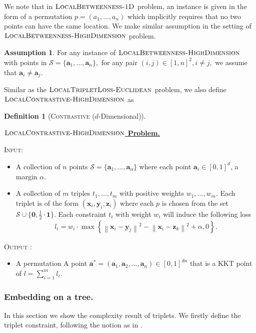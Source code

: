 \documentclass{article}
\theoremstyle{definition}  %
\newtheorem{assumption}{Assumption}
\theoremstyle{plain}
\newtheorem{definition}{Definition}
\numberwithin{observation}{section}
\numberwithin{claim}{section}
\numberwithin{fact}{section}
\numberwithin{lemma}{section}
\numberwithin{proposition}{section}
\numberwithin{theorem}{section}
\numberwithin{corollary}{section}
\numberwithin{definition}{section}
\def\va{{\bm{a}}}
\def\vx{{\bm{x}}}
\def\vy{{\bm{y}}}
\def\vz{{\bm{z}}}
\newcommand{\calS}{\ensuremath{\mathcal{S}}}
\newcommand{\norm}[1]{\left\| #1 \right\|}
\newenvironment{nproblem}[1][\unskip]{%
  \medskip
  \begin{mdframed}
  \noindent
  \textbf{\underline{$#1$ Problem.}} \\
  \noindent
}{%
  \end{mdframed}
  \medskip %
}
\newcommand{\betweeness}{\textsc{LocalBetweenness-1D}}
\newcommand{\betweenessHighdim}{\textsc{LocalBetweenness-HighDimension}}
\newcommand{\Contrastive}{\textsc{LocalTripletLoss-Euclidean}}
\newcommand{\ContrastiveHighDim}{\textsc{LocalContrastive-HighDimension}}
\theoremstyle{plain}
\begin{document}
We note that in $\betweeness$ problem, an instance is given in the form of a permutation $p = (a_1, \dots, a_n)$ which implicitly requires that no two points can have the same location. We make similar assumption in the setting of $\betweenessHighdim$ problem.

\begin{assumption}
    For any instance of $\betweenessHighdim$ with points in $\calS = \{\va_1, \dots, \va_n\},$ for any pair $(i, j) \in [1, n]^2, i\neq j,$ we assume that $\va_i \neq \va_j.$
\end{assumption}

Similar as the $\Contrastive$ problem, we also define $\ContrastiveHighDim$ as
\begin{definition}[\textsc{Contrastive} ($d$-Dimensional)]
\end{definition}

\begin{nproblem}[\ContrastiveHighDim]
 \textsc{Input:}  
 \begin{itemize}
    \vspace{-0.1in}
   \item A collection of $n$ points $\calS = \{\va_1,\dots,\va_n\}$ where each point $\va_i \in [0, 1]^d$, a margin $\alpha$.
   \item A collection of $m$ triples $t_1,\dots, t_{m}$ with positive weights $w_1,\dots, w_{m}$. Each triplet is of the form $(\vx_i,\vy_i,\vz_i)$ where each $p$ is chosen from the set $\calS \cup \{\bm{0}, \frac{1}{2}\cdot \bm{1}\}$. Each constraint $t_i$ with weight $w_i$ will induce the following loss
   \begin{align*}
       l_i = w_i \cdot \max \left\{\norm{\vx_i - \vy_j}^2 - \norm{\vx_i - \vz_k}^2 + \alpha, 0\right\}.
   \end{align*}
\end{itemize}
\vspace{-0.1in}
  \noindent \textsc{Output :} \begin{itemize}[label = ]
      \vspace{-0.1in}
      \item A permutation A point $\bm{a}^* = (\va_1, \va_2, \dots, \va_n) \in [0, 1]^{dn}$ that is a KKT point of $l = \sum_{i = 1}^m l_i.$
      \end{itemize}
\end{nproblem}


\subsubsection{Embedding on a tree.}
In this section we show the complexity result of triplets. We firstly define the triplet constraint, following the notion as in \citep{chatziafratis2023triplet}.
\end{document}
